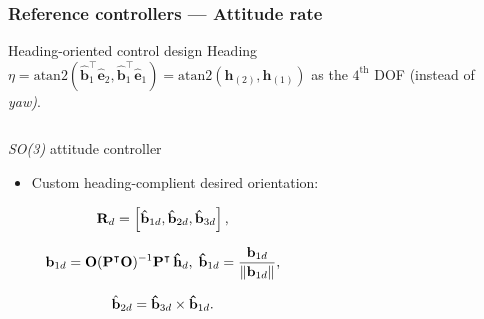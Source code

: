 \documentclass[aspectratio=169]{beamer}
\begin{document}



\begin{frame}
\frametitle{Reference controllers --- Attitude rate}

\begin{block}{\small Heading-oriented control design}
  \small Heading $\eta = \mathrm{atan2}\left(\mathbf{\hat{b}}_1^\intercal\mathbf{\hat{e}}_2, \mathbf{\hat{b}}_1^\intercal\mathbf{\hat{e}}_1\right) = \mathrm{atan2}\left(\mathbf{h}_{(2)}, \mathbf{h}_{(1)}\right)$ as the $4^{\mathrm{th}}$ DOF (instead of \emph{yaw)}.
\end{block}

\begin{columns}[c]


\begin{block}{\small \emph{SO(3)} attitude controller \cite{lee2010geometric}}
  \begin{itemize}
    \item \scriptsize Custom heading-complient desired orientation:
  \end{itemize}

  \begin{equation}
    \scriptsize
    \mathbf{R}_d = \left[\mathbf{\hat{b}}_{1d}, \mathbf{\hat{b}}_{2d}, \mathbf{\hat{b}}_{3d}\right],
  \end{equation}

  \begin{equation}
    \scriptsize
    \mathbf{b}_{1d} = \mathbf{O}(\mathbf{P}^\intercal\mathbf{O})^{-1}\mathbf{P}^\intercal\,\mathbf{\hat{h}}_d,\ \mathbf{\hat{b}}_{1d} = \frac{\mathbf{b}_{1d}}{\|\mathbf{b}_{1d}\|},
  \end{equation}

  \begin{equation}
    \scriptsize
    \hat{\mathbf{b}}_{2d} = \mathbf{\hat{b}}_{3d}\times \mathbf{\hat{b}}_{1d}.
  \end{equation}

\end{block}


  \vspace{-1em}


\end{columns}
\end{frame}
\end{document}

